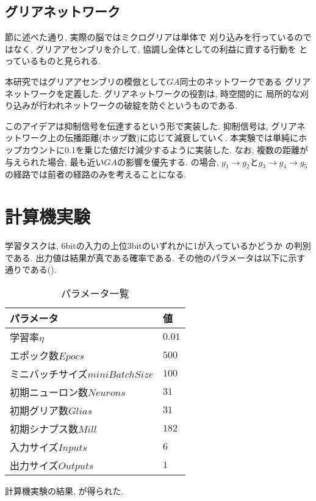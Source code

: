 \documentclass[a4paper,10.5pt,twocolumn]{jsarticle}
\begin{document}
\subsection{グリアネットワーク}
節に述べた通り, 実際の脳ではミクログリアは単体で
刈り込みを行っているのではなく, 
グリアアセンブリを介して, 協調し全体としての利益に資する行動を
とっているものと見られる.

本研究ではグリアアセンブリの模倣として$GA$同士のネットワークである
グリアネットワークを定義した.
グリアネットワークの役割は, 時空間的に
局所的な刈り込みが行われネットワークの破綻を防ぐというものである.

このアイデアは抑制信号を伝達するという形で実装した.
抑制信号は, グリアネットワーク上の伝播距離(ホップ数)に応じて減衰していく.
本実験では単純にホップカウントに0.1を乗じた値だけ減少するように実装した.
なお, 複数の距離が与えられた場合, 最も近い$GA$の影響を優先する.
の場合, $g_1\rightarrow g_2$と$g_3\rightarrow g_4 \rightarrow g_5$の経路では前者の経路のみを考えることになる.

\section{計算機実験}
学習タスクは, 6bitの入力の上位3bitのいずれかに1が入っているかどうか
の判別である. 出力値は結果が真である確率である. 
その他のパラメータは以下に示す通りである().
\begin{table}[H]
  \caption{パラメータ一覧}
  \label{tab:param}
  \centering
   \begin{tabular}{ll}
    \toprule
      パラメータ&値\\\midrule
      学習率$\eta$&$0.01$\\
      エポック数$Epocs$&$500$\\
      ミニバッチサイズ$miniBatchSize$&$100$\\
      初期ニューロン数$Neurons$&$31$\\
      初期グリア数$Glias$&$31$\\
      初期シナプス数$Mill$&$182$\\
      入力サイズ$Inputs$&$6$\\
      出力サイズ$Outputs$&$1$\\
    \bottomrule
   \end{tabular}
 \end{table}
計算機実験の結果, が得られた.


 
\end{document}
